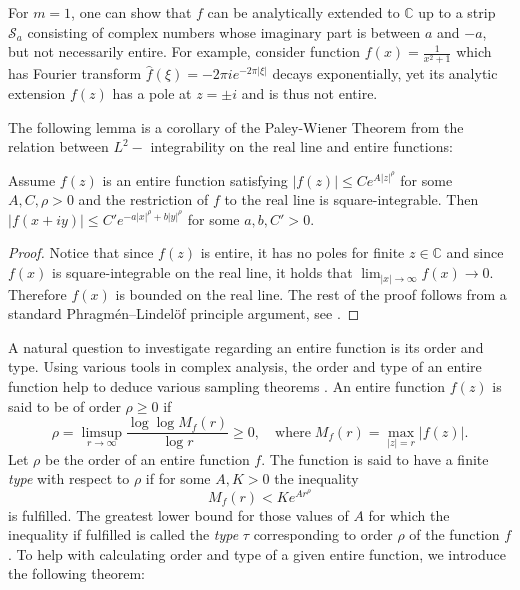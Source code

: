 \documentclass[graybox]{svmult}
\newcommand{\C}{\mathbb{C}}
\begin{document}
\begin{remark} 
    For $m =1$, one can show that $f$ can be analytically extended to $\C$ up to a strip $\mathcal{S}_a$ consisting of complex numbers whose imaginary part is between $a$ and $-a$, but not necessarily entire. For example, consider function $f(x) = \frac{1}{x^2+1}$ which has Fourier transform $\hat{f}(\xi) = - 2\pi i e^{- 2\pi |\xi|}$ decays exponentially, yet its analytic extension $f(z)$ has a pole at $z= \pm i$ and is thus not entire.
\end{remark}

The following lemma is a corollary of the Paley-Wiener Theorem from the relation between $L^2-$ integrability on the real line and entire functions: 
\begin{corollary}\label{ImaginaryLine}
    Assume $f(z)$ is an entire function satisfying $|f(z)| \leq Ce^{A|z|^\rho}$ for some $A,C,\rho>0$ and the restriction of $f$ to the real line is square-integrable. Then $|f(x+iy)| \leq C' e^{-a|x|^{\rho}+b|y|^\rho}$ for some $a,b,C'>0$. 
\end{corollary}
\begin{proof}
    Notice that since $f(z)$ is entire, it has no poles for finite $z \in \C$ and since $f(x)$ is square-integrable on the real line, it holds that $\lim_{|x|\to \infty}f(x) \to 0$. Therefore $f(x)$ is bounded on the real line. The rest of the proof follows from a standard Phragmén–Lindelöf principle argument, see \cite[Page 124]{stein2010complex}.
\end{proof}
A natural question to investigate regarding an entire function is its order and type. Using various tools in complex analysis, the order and type of an entire function help to deduce various sampling theorems \cite{marco2003interpolating}. An entire function $f(z)$ is said to be of order $\rho \geq 0$ if 
\begin{equation}\label{OrderBound}
    \rho = \limsup_{r \to \infty} \frac{\log \log M_f(r)}{\log r} \geq 0, \quad \text{where}\; M_f(r) = \max_{|z|=r}|f(z)|.   
\end{equation}
Let $\rho$ be the order of an entire function $f$. The function is said to have a finite \textit{type} with respect to $\rho$ if for some $A,K>0$ the inequality
$$M_f(r) < Ke^{Ar^{\rho}}$$
is fulfilled. The greatest lower bound for those values of $A$ for which the inequality if fulfilled is called the \textit{type} $\tau$ corresponding to order $\rho$ of the function $f$. To help with calculating order and type of a given entire function, we introduce the following theorem:
\end{document}
